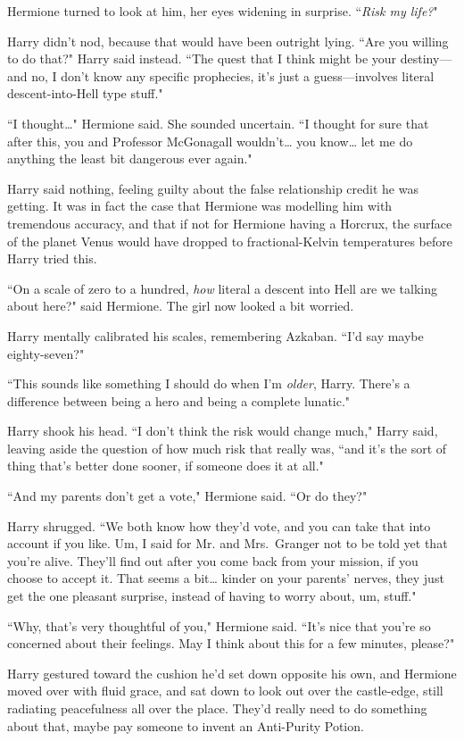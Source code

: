 Hermione turned to look at him, her eyes widening in surprise. ``\emph{Risk my life?}"

Harry didn't nod, because that would have been outright lying. ``Are you willing to do that?" Harry said instead. ``The quest that I think might be your destiny---and no, I don't know any specific prophecies, it's just a guess---involves literal descent-into-Hell type stuff."

``I thought{\ldots}" Hermione said. She sounded uncertain. ``I thought for sure that after this, you and Professor McGonagall wouldn't{\ldots} you know{\ldots} let me do anything the least bit dangerous ever again."

Harry said nothing, feeling guilty about the false relationship credit he was getting. It was in fact the case that Hermione was modelling him with tremendous accuracy, and that if not for Hermione having a Horcrux, the surface of the planet Venus would have dropped to fractional-Kelvin temperatures before Harry tried this.

``On a scale of zero to a hundred, \emph{how} literal a descent into Hell are we talking about here?" said Hermione. The girl now looked a bit worried.

Harry mentally calibrated his scales, remembering Azkaban. ``I'd say maybe eighty-seven?"

``This sounds like something I should do when I'm \emph{older}, Harry. There's a difference between being a hero and being a complete lunatic."

Harry shook his head. ``I don't think the risk would change much," Harry said, leaving aside the question of how much risk that really was, ``and it's the sort of thing that's better done sooner, if someone does it at all."

``And my parents don't get a vote," Hermione said. ``Or do they?"

Harry shrugged. ``We both know how they'd vote, and you can take that into account if you like. Um, I said for Mr. and Mrs.~Granger not to be told yet that you're alive. They'll find out after you come back from your mission, if you choose to accept it. That seems a bit{\ldots} kinder on your parents' nerves, they just get the one pleasant surprise, instead of having to worry about, um, stuff."

``Why, that's very thoughtful of you," Hermione said. ``It's nice that you're so concerned about their feelings. May I think about this for a few minutes, please?"

Harry gestured toward the cushion he'd set down opposite his own, and Hermione moved over with fluid grace, and sat down to look out over the castle-edge, still radiating peacefulness all over the place. They'd really need to do something about that, maybe pay someone to invent an Anti-Purity Potion.

